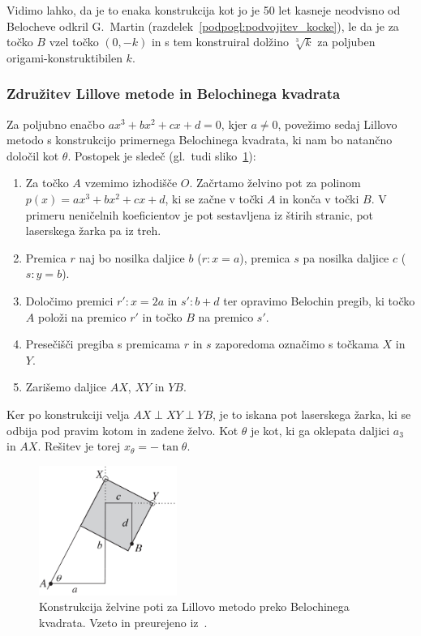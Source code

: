 Vidimo lahko, da je to enaka konstrukcija kot jo je 50 let kasneje neodvisno od Belocheve odkril G.\ Martin (razdelek~\ref{podpogl:podvojitev_kocke}), le da je za točko $B$ vzel točko $(0, -k)$ in s tem konstruiral dolžino $\sqrt[3]{k}$ za poljuben origami-konstruktibilen $k$.

\subsubsection*{Združitev Lillove metode in Belochinega kvadrata}

Za poljubno enačbo $a x^3 + b x^2 + c x + d = 0$, kjer $ a \neq 0$, povežimo sedaj Lillovo metodo s konstrukcijo primernega Belochinega kvadrata, ki nam bo natančno določil kot $\theta$. Postopek je sledeč (gl.\ tudi sliko~\ref{fig:beloch_kubicna_resitev}):

\begin{enumerate}
    \item Za točko $A$ vzemimo izhodišče $O$. Začrtamo želvino pot za polinom $p(x) = a x^3 + b x^2 + c x + d$, ki se začne v točki $A$ in konča v točki $B$. V primeru neničelnih koeficientov je pot sestavljena iz štirih stranic, pot laserskega žarka pa iz treh.
    \item Premica $r$ naj bo nosilka daljice $b$ ($r: x = a$), premica $s$ pa nosilka daljice $c$ ($s: y = b$).
    \item Določimo premici $r': x = 2a$ in $s': b + d$ ter opravimo Belochin pregib, ki točko $A$ položi na premico $r'$ in točko $B$ na premico $s'$.
    \item Presečišči pregiba s premicama $r$ in $s$ zaporedoma označimo s točkama $X$ in $Y$.
    \item Zarišemo daljice $AX$, $XY$ in $YB$.
\end{enumerate}

Ker po konstrukciji velja $ AX \perp XY \perp YB $, je to iskana pot laserskega žarka, ki se odbija pod pravim kotom in zadene želvo. Kot $\theta$ je kot, ki ga oklepata daljici $a_3$ in $AX$. Rešitev je torej $x_{\theta} = - \tan \theta$.

\begin{figure}[h]
    \centering
    \includegraphics[width=0.4\textwidth]{images/kubična enačba/beloch_kubicna_resitev.png}
    \caption[Lillova metoda z Belochinim kvadratom]{Konstrukcija želvine poti za Lillovo metodo preko Belochinega kvadrata. Vzeto in preurejeno iz~\cite[str.\ 313]{hull2011}.}
    \label{fig:beloch_kubicna_resitev}
\end{figure}

